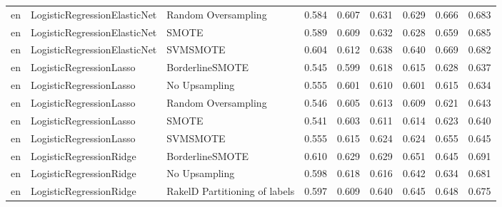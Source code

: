 \begin{tabular}{lllllllll}
      en &    LogisticRegressionElasticNet &           Random Oversampling & 0.584 &                     0.607 &                 0.631 &                  0.629 &                                   0.666 &     0.683 \\
      en &    LogisticRegressionElasticNet &                         SMOTE & 0.589 &                     0.609 &                 0.632 &                  0.628 &                                   0.659 &     0.685 \\
      en &    LogisticRegressionElasticNet &                      SVMSMOTE & 0.604 &                     0.612 &                 0.638 &                  0.640 &                                   0.669 &     0.682 \\
      en &         LogisticRegressionLasso &               BorderlineSMOTE & 0.545 &                     0.599 &                 0.618 &                  0.615 &                                   0.628 &     0.637 \\
      en &         LogisticRegressionLasso &                 No Upsampling & 0.555 &                     0.601 &                 0.610 &                  0.601 &                                   0.615 &     0.634 \\
      en &         LogisticRegressionLasso &           Random Oversampling & 0.546 &                     0.605 &                 0.613 &                  0.609 &                                   0.621 &     0.643 \\
      en &         LogisticRegressionLasso &                         SMOTE & 0.541 &                     0.603 &                 0.611 &                  0.614 &                                   0.623 &     0.640 \\
      en &         LogisticRegressionLasso &                      SVMSMOTE & 0.555 &                     0.615 &                 0.624 &                  0.624 &                                   0.655 &     0.645 \\
      en &         LogisticRegressionRidge &               BorderlineSMOTE & 0.610 &                     0.629 &                 0.629 &                  0.651 &                                   0.645 &     0.691 \\
      en &         LogisticRegressionRidge &                 No Upsampling & 0.598 &                     0.618 &                 0.616 &                  0.642 &                                   0.634 &     0.681 \\
      en &         LogisticRegressionRidge & RakelD Partitioning of labels & 0.597 &                     0.609 &                 0.640 &                  0.645 &                                   0.648 &     0.675 \\

\end{tabular}
